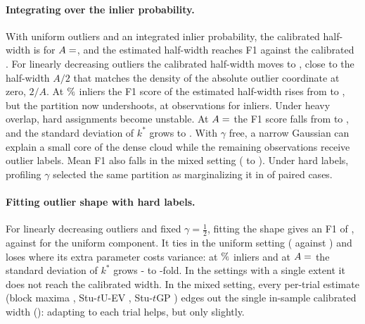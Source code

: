 \documentclass[10pt,twocolumn,letterpaper]{article}
\newcommand{\mname}[1]{\texorpdfstring{#1\xspace}{#1}}
\newif\ifsubscriptnames
\newcommand{\evname}{\ifsubscriptnames$_{\mathrm{EV}}$\else-EV\fi}
\newcommand{\stuUev}{\mname{Stu-$t$U\evname}}
\newcommand{\stuGP}{\mname{Stu-$t$GP}}
\begin{document}
\paragraph{Integrating over the inlier probability.}
With uniform outliers and an integrated inlier probability, the calibrated half-width is
 for $A=\syncase{uniform}{halfwidth}$, and the
estimated half-width reaches F1
 against the calibrated
. For linearly decreasing
outliers the calibrated half-width moves to
, close to the half-width $A/2$ that matches the density of the absolute outlier coordinate at zero, $2/A$. At $\syncase{uniform_3pct}{percent}\%$ inliers the F1
score of the estimated half-width rises from
 to
, but the partition now
undershoots, at 
observations for  inliers. Under heavy overlap, hard assignments become unstable. At $A=\syncase{uniform_A10}{halfwidth}$ the F1 score falls from
 to
, and the standard
deviation of $k^*$ grows to
. With $\gamma$ free, a narrow Gaussian can explain a small core of the dense cloud while the remaining observations receive outlier labels.
Mean F1 also falls in the mixed setting (
 to
). Under hard labels,
profiling $\gamma$ selected the same partition as marginalizing it in
\SynProfileSame{} of \SynProfilePairs{} paired cases.

\paragraph{Fitting outlier shape with hard labels.}
For linearly decreasing outliers and fixed $\gamma=\tfrac12$, fitting the shape gives an F1 of
, against
 for the uniform component. It
ties in the uniform setting ( against
) and loses where its extra
parameter costs variance: at $\syncase{uniform_3pct}{percent}\%$ inliers and at $A=\syncase{uniform_A10}{halfwidth}$ the standard
deviation of $k^*$ grows \SynSdRatioMin- to \SynSdRatioMax-fold. In the settings with a single extent it does not reach the calibrated
width. In the mixed setting, every per-trial
estimate (block maxima , \stuUev
{}, \stuGP
{}) edges out the single in-sample
calibrated width (): adapting
to each trial helps, but only slightly.
\end{document}
